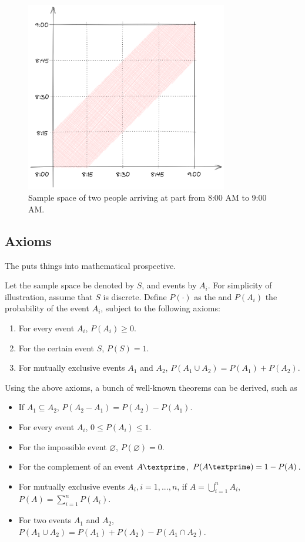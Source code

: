 \begin{figure}[!htb]
	\centering
	\includegraphics[width=250pt]{chapters/part-1/figures/geometricprobexp.png}
	\caption{Sample space of two people arriving at part from 8:00 AM to 9:00 AM.} \label{fig:geometricprobexp}
\end{figure}

\subsection{Axioms} \label{subsec:probability_axioms}

The  puts things into mathematical prospective. 

Let the sample space be denoted by $S$, and events by $A_i$. For simplicity of illustration, assume that $S$ is discrete. Define $P(\cdot)$ as the  and $P(A_i)$ the probability of the event $A_i$, subject to the following axioms:
\begin{enumerate}
  \item For every event $A_i$, $P(A_i)\geq 0$.
  \item For the certain event $S$, $P(S)=1$.
  \item For mutually exclusive events $A_1$ and $A_2$, $P\left(A_1\cup A_2\right) = P(A_1)+P(A_2)$.
\end{enumerate}

Using the above axioms, a bunch of well-known theorems can be derived, such as
\begin{itemize}
  \item If $A_1 \subseteq A_2$, $P(A_2-A_1) = P(A_2)-P(A_1)$.
  \item For every event $A_i$, $0\leq P(A_i) \leq 1$.
  \item For the impossible event $\varnothing$, $P(\varnothing)=0$.
  \item For the complement of an event $A\textprime$, $P(A\textprime)=1-P(A)$.
  \item For mutually exclusive events $A_i, i=1,...,n$, if $A = \bigcup_{i=1}^{n} A_i$, $P(A) = \sum_{i=1}^{n}P(A_i)$.
  \item For two events $A_1$ and $A_2$, $P\left(A_1\cup A_2\right) = P(A_1)+P(A_2)-P\left(A_1\cap A_2\right)$.
\end{itemize}

